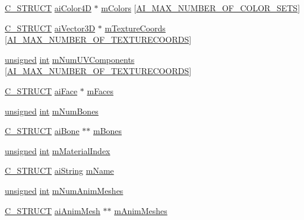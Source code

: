 \begin{DoxyCompactItemize}
\item 
\hyperlink{ai_defines_8h_ab51df4230ceb602bbc1bc109c432a6a0}{C\-\_\-\-S\-T\-R\-U\-C\-T} \hyperlink{structai_color4_d}{ai\-Color4\-D} $\ast$ \hyperlink{structai_mesh_ad9215f67bd0c2277b10775a8adb66b96}{m\-Colors} \mbox{[}\hyperlink{ai_mesh_8h_a74ea1282873ac4b111b48d2380c26bdc}{A\-I\-\_\-\-M\-A\-X\-\_\-\-N\-U\-M\-B\-E\-R\-\_\-\-O\-F\-\_\-\-C\-O\-L\-O\-R\-\_\-\-S\-E\-T\-S}\mbox{]}
\item 
\hyperlink{ai_defines_8h_ab51df4230ceb602bbc1bc109c432a6a0}{C\-\_\-\-S\-T\-R\-U\-C\-T} \hyperlink{structai_vector3_d}{ai\-Vector3\-D} $\ast$ \hyperlink{structai_mesh_a4a50b11d00ef50f419c75cab0f6bddd6}{m\-Texture\-Coords} \mbox{[}\hyperlink{ai_mesh_8h_a335874c5058c7f1e866eb953bf192258}{A\-I\-\_\-\-M\-A\-X\-\_\-\-N\-U\-M\-B\-E\-R\-\_\-\-O\-F\-\_\-\-T\-E\-X\-T\-U\-R\-E\-C\-O\-O\-R\-D\-S}\mbox{]}
\item 
\hyperlink{_free_image_8h_a425076c7067a1b5166e2cc530e914814}{unsigned} \hyperlink{wglew_8h_a500a82aecba06f4550f6849b8099ca21}{int} \hyperlink{structai_mesh_a635c631a6e66d32989d6b25b2a892d86}{m\-Num\-U\-V\-Components} \mbox{[}\hyperlink{ai_mesh_8h_a335874c5058c7f1e866eb953bf192258}{A\-I\-\_\-\-M\-A\-X\-\_\-\-N\-U\-M\-B\-E\-R\-\_\-\-O\-F\-\_\-\-T\-E\-X\-T\-U\-R\-E\-C\-O\-O\-R\-D\-S}\mbox{]}
\item 
\hyperlink{ai_defines_8h_ab51df4230ceb602bbc1bc109c432a6a0}{C\-\_\-\-S\-T\-R\-U\-C\-T} \hyperlink{structai_face}{ai\-Face} $\ast$ \hyperlink{structai_mesh_a5a65fbc7fdea7f8d36f39047425ece07}{m\-Faces}
\item 
\hyperlink{_free_image_8h_a425076c7067a1b5166e2cc530e914814}{unsigned} \hyperlink{wglew_8h_a500a82aecba06f4550f6849b8099ca21}{int} \hyperlink{structai_mesh_a0f9d5425b6300e32a842a94f943fd79e}{m\-Num\-Bones}
\item 
\hyperlink{ai_defines_8h_ab51df4230ceb602bbc1bc109c432a6a0}{C\-\_\-\-S\-T\-R\-U\-C\-T} \hyperlink{structai_bone}{ai\-Bone} $\ast$$\ast$ \hyperlink{structai_mesh_a0c0582a7f45b340b6a33552c53232539}{m\-Bones}
\item 
\hyperlink{_free_image_8h_a425076c7067a1b5166e2cc530e914814}{unsigned} \hyperlink{wglew_8h_a500a82aecba06f4550f6849b8099ca21}{int} \hyperlink{structai_mesh_aa2807c7ba172115203ed16047ad65f9e}{m\-Material\-Index}
\item 
\hyperlink{ai_defines_8h_ab51df4230ceb602bbc1bc109c432a6a0}{C\-\_\-\-S\-T\-R\-U\-C\-T} \hyperlink{structai_string}{ai\-String} \hyperlink{structai_mesh_a8dd9433e0c5b008e3e5aee6c801d3b74}{m\-Name}
\item 
\hyperlink{_free_image_8h_a425076c7067a1b5166e2cc530e914814}{unsigned} \hyperlink{wglew_8h_a500a82aecba06f4550f6849b8099ca21}{int} \hyperlink{structai_mesh_a1692a300222b32348ae51779df4a697e}{m\-Num\-Anim\-Meshes}
\item 
\hyperlink{ai_defines_8h_ab51df4230ceb602bbc1bc109c432a6a0}{C\-\_\-\-S\-T\-R\-U\-C\-T} \hyperlink{structai_anim_mesh}{ai\-Anim\-Mesh} $\ast$$\ast$ \hyperlink{structai_mesh_a5078f7db7e99ed05db89dfa412f0e990}{m\-Anim\-Meshes}
\end{DoxyCompactItemize}


